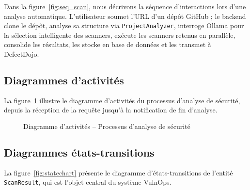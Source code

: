 \documentclass[12pt, a4paper, oneside]{report}
\begin{document}
Dans la figure~\ref{fig:seq_scan}, nous décrivons la séquence d'interactions
lors d'une analyse automatique. L'utilisateur soumet l'URL d'un dépôt GitHub ;
le backend clone le dépôt, analyse sa structure via \texttt{ProjectAnalyzer},
interroge Ollama pour la sélection intelligente des scanners, exécute
les scanners retenus en parallèle, consolide les résultats, les stocke en base
de données et les transmet à DefectDojo.

\subsection{Diagrammes d'activités}
\label{subsec:activites}

La figure~\ref{fig:activity_scan} illustre le diagramme d'activités du processus
d'analyse de sécurité, depuis la réception de la requête jusqu'à la notification
de fin d'analyse.

\begin{figure}[H]
    \centering
    \caption{Diagramme d'activités -- Processus d'analyse de sécurité}
    \label{fig:activity_scan}
\end{figure}

\subsection{Diagrammes états-transitions}
\label{subsec:etats}

La figure~\ref{fig:statechart} présente le diagramme d'états-transitions
de l'entité \texttt{ScanResult}, qui est l'objet central du système VulnOps.
\end{document}
